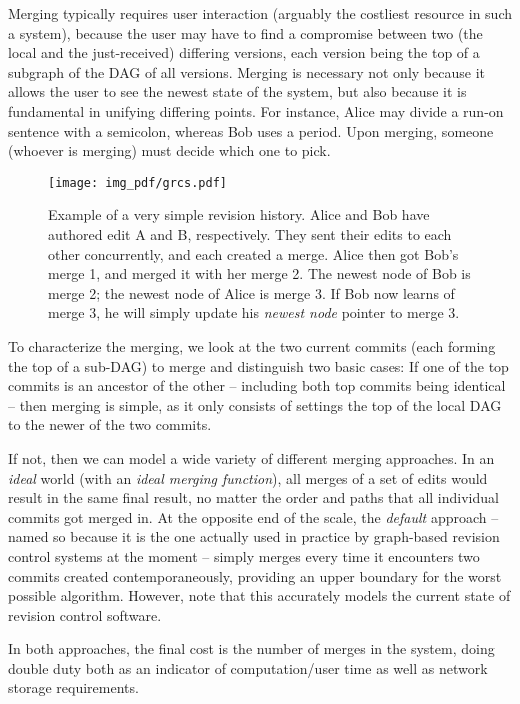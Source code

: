 \documentclass[conference,a4paper]{IEEEtran}
\begin{document}
Merging typically requires user interaction (arguably the costliest resource in such a system), because the user may have to find a compromise between two (the local and the just-received) differing versions, each version being the top of a subgraph of the DAG of all versions. Merging is necessary not only because it allows the user to see the newest state of the system, but also because it is fundamental in unifying differing points. For instance, Alice may divide a run-on sentence with a semicolon, whereas Bob uses a period. Upon merging, someone (whoever is merging) must decide which one to pick.

\begin{figure}
  \texttt{[image: img\_pdf/grcs.pdf]}
  \caption{Example of a very simple revision history. Alice and Bob have authored edit A and B, respectively. They sent their edits to each other concurrently, and each created a merge. Alice then got Bob's merge 1, and merged it with her merge 2. The newest node of Bob is merge 2; the newest node of Alice is merge 3. If Bob now learns of merge 3, he will simply update his \textit{newest node} pointer to merge 3.}
  \label{fig:grcs}
\end{figure}

To characterize the merging, we look at the two current commits (each forming the top of a sub-DAG) to merge and distinguish two basic cases: If one of the top commits is an ancestor of the other -- including both top commits being identical -- then merging is simple, as it only consists of settings the top of the local DAG to the newer of the two commits.

If not, then we can model a wide variety of different merging approaches. In an \textit{ideal} world (with an \textit{ideal merging function}), all merges of a set of edits would result in the same final result, no matter the order and paths that all individual commits got merged in. At the opposite end of the scale, the \textit{default} approach -- named so because it is the one actually used in practice by graph-based revision control systems at the moment -- simply merges every time it encounters two commits created contemporaneously, providing an upper boundary for the worst possible algorithm. However, note that this accurately models the current state of revision control software.

In both approaches, the final cost is the number of merges in the system, doing double duty both as an indicator of computation/user time as well as network storage requirements.
\end{document}
